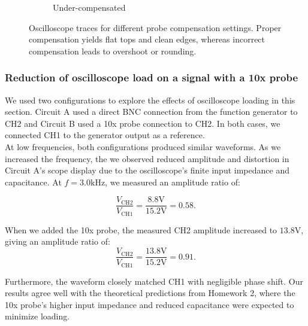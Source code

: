 \documentclass{article}
\begin{document}
\begin{figure}[H]
\begin{subfigure}[t]{0.32\textwidth}
        \caption{Under-compensated}
        \label{fig:under}
    \end{subfigure}
    \caption{Oscilloscope traces for different probe compensation settings. 
    Proper compensation yields flat tops and clean edges, whereas incorrect 
    compensation leads to overshoot or rounding.}
    \label{fig:compensation_all}
\end{figure}


\subsubsection{Reduction of oscilloscope load on a signal with a 10x probe}

We used two configurations to explore the effects of oscilloscope loading in
this section. Circuit A used a direct BNC connection from the function generator
to CH2 and Circuit B used a 10x probe connection to CH2. In both cases, we
connected CH1 to the generator output as a reference.\\

\noindent At low frequencies, both configurations produced similar waveforms. As we
increased the frequency, the we observed reduced amplitude and distortion in
Circuit A's scope display due to the oscilloscope's finite input impedance and
capacitance. At $f=3.0\si{\kilo\hertz}$, we measured an amplitude ratio of:

\begin{equation}
    \frac{V_{\text{CH2}}}{V_{\text{CH1}}}=\frac{8.8\si{\volt}}{15.2\si{\volt}}=0.58.
\end{equation}

\noindent When we added the 10x probe, the measured CH2 amplitude increased to $13.8\si{\volt}$,
giving an amplitude ratio of:
\begin{equation}
    \frac{V_{\text{CH2}}}{V_{\text{CH1}}}=\frac{13.8\si{\volt}}{15.2\si{\volt}}=0.91.
\end{equation}

\noindent Furthermore, the waveform closely matched CH1 with negligible phase
shift. Our results agree well with the theoretical predictions from Homework 2,
where the 10x probe's higher input impedance and reduced capacitance were
expected to minimize loading.
\end{document}
